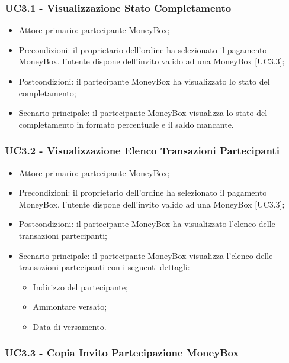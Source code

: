 \subsubsection{UC3.1 - Visualizzazione Stato Completamento}

\begin{itemize}
    \item Attore primario: partecipante MoneyBox\glo{};
    \item Precondizioni: il proprietario dell'ordine ha selezionato il pagamento MoneyBox\glo [UC2.2.2], 
            l'utente dispone dell'invito valido ad una MoneyBox\glo{} [UC3.3];
    \item Postcondizioni: il partecipante MoneyBox\glo{} ha visualizzato lo stato del completamento;
    \item Scenario principale: il partecipante MoneyBox\glo{} visualizza lo stato del completamento in formato percentuale e il saldo mancante.
\end{itemize}

\subsubsection{UC3.2 - Visualizzazione Elenco Transazioni Partecipanti}

\begin{itemize}
    \item Attore primario: partecipante MoneyBox\glo{};
    \item Precondizioni: il proprietario dell'ordine ha selezionato il pagamento MoneyBox\glo [UC2.2.2], 
            l'utente dispone dell'invito valido ad una MoneyBox\glo{} [UC3.3];
    \item Postcondizioni: il partecipante MoneyBox\glo{} ha visualizzato l'elenco delle transazioni partecipanti;
    \item Scenario principale: il partecipante MoneyBox\glo{} visualizza l'elenco delle transazioni partecipanti con i seguenti dettagli:
        \begin{itemize}
            \item Indirizzo del partecipante;
            \item Ammontare versato;
            \item Data di versamento.
        \end{itemize}
\end{itemize}

\subsubsection{UC3.3 - Copia Invito Partecipazione MoneyBox}

